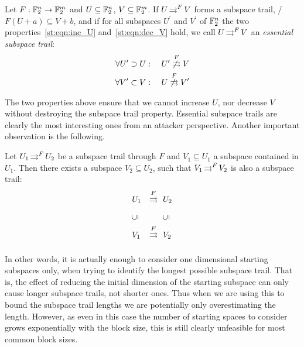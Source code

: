 \begin{definition}\label{st:def:essential}
    Let $F : \mathbb{F}_2^n \to \mathbb{F}_2^m$ and $U \subseteq \mathbb{F}_2^n$, $V \subseteq \mathbb{F}_2^m$.
    If $U \operatorname*{\rightrightarrows}^{F}_{} V$ forms a subspace trail, \ie/ $F(U + a) \subseteq V + b$, and if for all subspaces $U^\prime$ and $V^\prime$ of $\mathbb{F}_2^n$ the two properties~\eqref{st:eqn:inc_U} and~\eqref{st:eqn:dec_V} hold, we call $U \operatorname*{\rightrightarrows}^{F}_{} V$ an \emph{essential subspace trail}:
    \begin{alignat}{3}
        \forall U^\prime \supset U &:&\ \nsubspacetrail{U^\prime}{F}{V} \label{st:eqn:inc_U} \\
        \forall V^\prime \subset V &:&\ \nsubspacetrail{U}{F}{V^\prime} \label{st:eqn:dec_V}
    \end{alignat}
\end{definition}
The two properties above ensure that we cannot increase $U$, nor decrease $V$ without destroying the subspace trail property.
Essential subspace trails are clearly the most interesting ones from an attacker perspective.
Another important observation is the following.
\begin{corollary}\label{st:cor:one_dim_trails}
    Let $U_1 \operatorname*{\rightrightarrows}^{F}_{} U_{2}$ be a subspace trail through $F$ and
    $V_1 \subseteq U_1$ a subspace contained in $U_1$.
    Then there exists a subspace $V_2 \subseteq U_2$, such that $V_1 \operatorname*{\rightrightarrows}^{F}_{} V_{2}$ is also a subspace trail:
    \begin{equation}
    \begin{aligned}
        & U_1 & \propDiff{}{F}{}{}\ &\ U_2 \\
        & \rotatebox[origin=c]{90}{$\subseteq$} & &\ \rotatebox[origin=c]{90}{$\subseteq$} \\
        & V_1 & \propDiff{}{F}{}{}\ &\ V_2
    \end{aligned}
    \end{equation}
\end{corollary}
In other words, it is actually enough to consider one dimensional starting subspaces only, when trying to identify the longest possible subspace trail.
That is, the effect of reducing the initial dimension of the starting subspace can only cause longer subspace trails, not shorter ones.
Thus when we are using this to bound the subspace trail lengths we are potentially only overestimating the length.
However, as even in this case the number of starting spaces to consider grows exponentially with the block size, this is still clearly unfeasible for most common block sizes.

